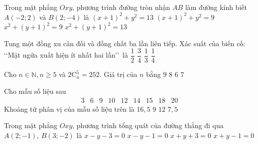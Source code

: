 \begin{ex}%
	Trong mặt phẳng $Oxy$, phương trình đường tròn nhận $AB$ làm đường kính biết $A(-2; 2)$ và $B(2;-4)$ là
	\choice
	{$(x+1)^{2}+y^{2}=13$}
	{$(x+1)^{2}+y^{2}=9$}
	{$x^{2}+(y+1)^{2}=9$}
	{\True $x^{2}+(y+1)^{2}=13$}
\end{ex}

\begin{ex}%
	Tung một đồng xu cân đối và đồng chất ba lần liên tiếp. Xác suất của biến cố: \lq\lq Mặt ngửa xuất hiện ít nhất hai lần\rq\rq\, là
	\choice
	{\True $\dfrac{1}{2}$}
	{$\dfrac{3}{4}$}
	{$\dfrac{1}{3}$}
	{$\dfrac{1}{4}$}
\end{ex}

\begin{ex}%
	Cho $n \in \mathbb{N}, n \geq 5$ và $2\mathrm{C}_{n}^{5}=252$. Giá trị của $n$ bằng
	\choice
	{\True $9$}
	{$8$}
	{$6$}
	{$7$}
\end{ex}

\begin{ex}%
	Cho mẫu số liệu sau
	$$\begin{array}{lllllllll}3 & 6 & 9 & 10 & 12 & 14 & 15 & 18 & 20\end{array}$$
	Khoảng tứ phân vị của mẫu số liệu trên là
	\choice
	{$16{,}5$}
	{\True $9$}
	{$12$}
	{$7{,}5$}
	\loigiai{
	
	}
\end{ex}

\begin{ex}%
	Trong mặt phẳng $Oxy$, phương trình tổng quát của đường thẳng đi qua $A(2;-1)$, $B(3;-2)$ là
	\choice
	{$x-y-3=0$}
	{$x-y-1=0$}
	{$x+y+3=0$}
	{\True $x+y-1=0$}
\end{ex}


